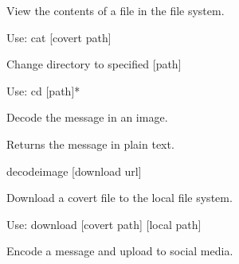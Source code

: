 \documentclass[letterpaper,12pt,openany,oneside]{sphinxmanual}
\begin{document}
\begin{fulllineitems}
\begin{fulllineitems}
\end{fulllineitems}


\begin{fulllineitems}
\label{console:webStegFS.console.Console.do_cat}
View the contents of a file in the file system.

Use: cat {[}covert path{]}

\end{fulllineitems}


\begin{fulllineitems}
\label{console:webStegFS.console.Console.do_cd}
Change directory to specified {[}path{]}

Use: cd {[}path{]}*

\end{fulllineitems}


\begin{fulllineitems}
\label{console:webStegFS.console.Console.do_decodemsg}
Decode the message in an image.

Returns the message in plain text.

decodeimage {[}download url{]}

\end{fulllineitems}


\begin{fulllineitems}
\label{console:webStegFS.console.Console.do_download}
Download a covert file to the local file system.

Use: download {[}covert path{]} {[}local path{]}

\end{fulllineitems}


\begin{fulllineitems}
\label{console:webStegFS.console.Console.do_encodemsg}
Encode a message and upload to social media.


\end{fulllineitems}
\end{fulllineitems}
\end{document}
